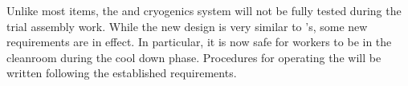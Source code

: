 Unlike most items, the \coldbox and cryogenics system will not be fully tested during the trial assembly work. While the new \coldbox design is very similar to 's, some new requirements are in effect. In particular, it is now safe for workers to be in the cleanroom during the cool down phase.  Procedures for operating the \coldbox will be written following the established requirements. 

  
